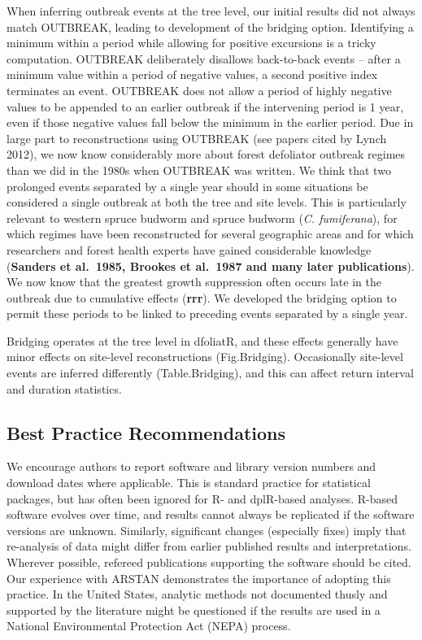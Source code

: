 \documentclass[review]{elsarticle} %
\begin{document}
When inferring outbreak events at the tree level, our initial results
did not always match OUTBREAK, leading to development of the bridging
option. Identifying a minimum within a period while allowing for
positive excursions is a tricky computation. OUTBREAK deliberately
disallows back-to-back events -- after a minimum value within a period
of negative values, a second positive index terminates an event.
OUTBREAK does not allow a period of highly negative values to be
appended to an earlier outbreak if the intervening period is 1 year,
even if those negative values fall below the minimum in the earlier
period. Due in large part to reconstructions using OUTBREAK (see papers
cited by Lynch 2012), we now know considerably more about forest
defoliator outbreak regimes than we did in the 1980s when OUTBREAK was
written. We think that two prolonged events separated by a single year
should in some situations be considered a single outbreak at both the
tree and site levels. This is particularly relevant to western spruce
budworm and spruce budworm (\emph{C. fumiferana}), for which regimes
have been reconstructed for several geographic areas and for which
researchers and forest health experts have gained considerable knowledge
(\textbf{Sanders et al.~1985, Brookes et al.~1987 and many later
publications}). We now know that the greatest growth suppression often
occurs late in the outbreak due to cumulative effects (\textbf{rrr}). We
developed the bridging option to permit these periods to be linked to
preceding events separated by a single year.

Bridging operates at the tree level in dfoliatR, and these effects
generally have minor effects on site-level reconstructions
(Fig.Bridging). Occasionally site-level events are inferred differently
(Table.Bridging), and this can affect return interval and duration
statistics.

\hypertarget{best-practice-recommendations}{%
\subsection{Best Practice
Recommendations}\label{best-practice-recommendations}}

We encourage authors to report software and library version numbers and
download dates where applicable. This is standard practice for
statistical packages, but has often been ignored for R- and dplR-based
analyses. R-based software evolves over time, and results cannot always
be replicated if the software versions are unknown. Similarly,
significant changes (especially fixes) imply that re-analysis of data
might differ from earlier published results and interpretations.
Wherever possible, refereed publications supporting the software should
be cited. Our experience with ARSTAN demonstrates the importance of
adopting this practice. In the United States, analytic methods not
documented thusly and supported by the literature might be questioned if
the results are used in a National Environmental Protection Act (NEPA)
process.
\end{document}
